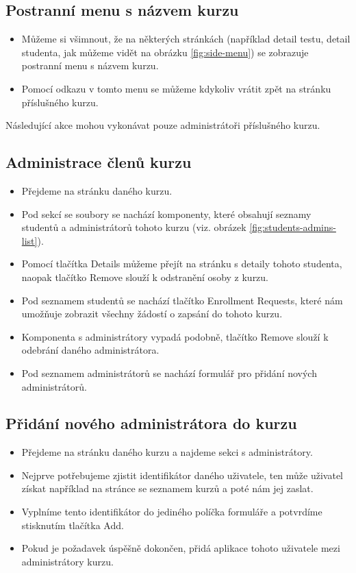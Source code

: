 \subsection{Postranní menu s názvem kurzu}
 \begin{itemize}
 	\item Můžeme si všimnout, že na některých stránkách (například detail testu, detail studenta, jak můžeme vidět na obrázku \ref{fig:side-menu}) se zobrazuje postranní menu s názvem kurzu.
 	\item Pomocí odkazu v tomto menu se můžeme kdykoliv vrátit zpět na stránku příslušného kurzu.
 \end{itemize}


Následující akce mohou vykonávat pouze administrátoři příslušného kurzu.

\subsection{Administrace členů kurzu}

 \begin{itemize}
	\item Přejdeme na stránku daného kurzu.
	\item Pod sekcí se soubory se nachází komponenty, které obsahují seznamy studentů a administrátorů tohoto kurzu (viz. obrázek \ref{fig:students-admins-list}). 
	\item Pomocí tlačítka Details můžeme přejít na stránku s detaily tohoto studenta, naopak tlačítko Remove slouží k odstranění osoby z kurzu.
	\item Pod seznamem studentů se nachází tlačítko Enrollment Requests, které nám umožňuje zobrazit všechny žádostí o zapsání do tohoto kurzu.
	\item Komponenta s administrátory vypadá podobně, tlačítko Remove slouží k odebrání daného administrátora.
	\item Pod seznamem administrátorů se nachází formulář pro přidání nových administrátorů.
\end{itemize}

\subsection{Přidání nového administrátora do kurzu}

\begin{itemize}
	\item Přejdeme na stránku daného kurzu a najdeme sekci s administrátory.
	\item Nejprve potřebujeme zjistit identifikátor daného uživatele, ten může uživatel získat například na stránce se seznamem kurzů a poté nám jej zaslat.
	\item Vyplníme tento identifikátor do jediného políčka formuláře a potvrdíme stisknutím tlačítka Add.
	\item Pokud je požadavek úspěšně dokončen, přidá aplikace tohoto uživatele mezi administrátory kurzu.
\end{itemize}

